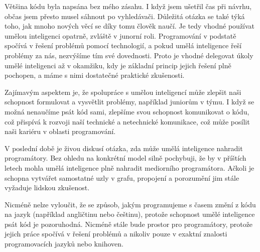 \documentclass[FM,DP]{tulthesis}
\begin{document}
		Většina kódu byla napsána bez mého zásahu. I když jsem ušetřil čas při návrhu, občas jsem přesto musel sáhnout po vyhledávači. Důležitá otázka se také týká toho, jak mnoho nových věcí se díky tomu člověk naučí. Je tedy vhodné používat umělou inteligenci opatrně, zvláště v junorní roli. Programování v podstatě spočívá v řešení problémů pomocí technologií, a pokud umělá inteligence řeší problémy za nás, nezvýšíme tím své dovednosti. Proto je vhodné delegovat úkoly umělé inteligenci až v okamžiku, kdy je základní princip jejich řešení plně pochopen, a máme s nimi dostatečné praktické zkušenosti.
		
		Zajímavým aspektem je, že spolupráce s umělou inteligencí může zlepšit naši schopnost formulovat a vysvětlit problémy, například juniorům v týmu. I když se možná nenaučíme psát kód sami, zlepšíme svou schopnost komunikovat o kódu, což přispívá k rozvoji naší technické a netechnické komunikace, což může posílit naši kariéru v oblasti programování.
		
		V poslední době je živou diskusí otázka, zda může umělá inteligence nahradit programátory. Bez ohledu na konkrétní model silně pochybuji, že by v příštích letech mohla umělá inteligence plně nahradit mediorního programátora. Ačkoli je schopna vytvářet samostatné uzly v grafu, propojení a porozumění jim stále vyžaduje lidskou zkušenost. 
		
		Nicméně nelze vyloučit, že se způsob, jakým programujeme s časem změní z kódu na jazyk (například angličtinu nebo češtinu), protože schopnost umělé inteligence psát kód je pozoruhodná. Nicméně stále bude prostor pro programátory, protože jejich práce spočívá v řešení problémů a nikoliv pouze v exaktní znalosti programovacích jazyků nebo knihoven.
		
		\printbibliography[title={Použitá literatura}] %
	
\end{document}
